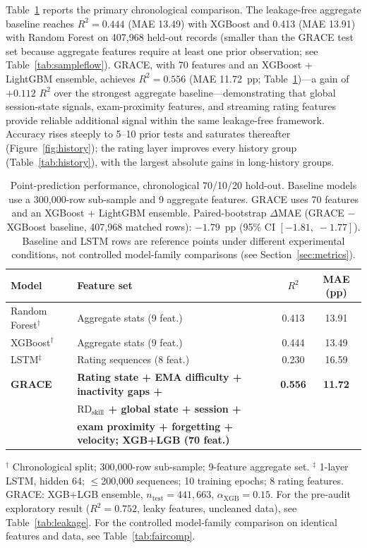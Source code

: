 \documentclass[11pt]{article}
\begin{document}
Table~\ref{tab:headline} reports the primary chronological comparison.
The leakage-free aggregate baseline reaches $R^{2}=0.444$ (MAE 13.49) with XGBoost and
0.413 (MAE 13.91) with Random Forest on 407{,}968 held-out records
(smaller than the GRACE test set because aggregate features require at least one prior observation;
see Table~\ref{tab:sampleflow}).
GRACE, with 70 features and an XGBoost + LightGBM ensemble, achieves $R^{2}=0.556$
(MAE 11.72~pp; Table~\ref{tab:headline})---a gain of $+0.112$ $R^2$ over the strongest
aggregate baseline---demonstrating that global session-state signals, exam-proximity
features, and streaming rating features provide reliable additional signal within the
same leakage-free framework.
Accuracy rises steeply to 5--10 prior tests and saturates thereafter
(Figure~\ref{fig:history}); the rating layer improves every history group
(Table~\ref{tab:history}), with the largest absolute gains in long-history groups.

\begin{table}[ht]
\centering
\caption{Point-prediction performance, chronological 70/10/20 hold-out.
Baseline models use a 300{,}000-row sub-sample and 9 aggregate features.
GRACE uses 70 features and an XGBoost + LightGBM ensemble.
Paired-bootstrap $\Delta$MAE (GRACE $-$ XGBoost baseline, 407{,}968 matched rows):
$-1.79$~pp (95\% CI $[-1.81,\;-1.77]$).
Baseline and LSTM rows are reference points under different experimental conditions, not
controlled model-family comparisons (see Section~\ref{sec:metrics}).}
\label{tab:headline}
\small
\begin{tabular}{@{}lp{4.8cm}cc@{}}
\toprule
\textbf{Model} & \textbf{Feature set} & $R^{2}$ & \textbf{MAE (pp)} \\
\midrule
Random Forest$^\dagger$ & Aggregate stats (9 feat.) & 0.413 & 13.91 \\
XGBoost$^\dagger$       & Aggregate stats (9 feat.) & 0.444 & 13.49 \\
LSTM$^\ddagger$         & Rating sequences (8 feat.) & 0.230 & 16.59 \\
\midrule
\textbf{GRACE}           & \textbf{Rating state + EMA difficulty + inactivity gaps +} & \textbf{0.556} & \textbf{11.72} \\
                        & \textbf{$\mathrm{RD}_{\text{skill}}$ + global state + session +} & & \\
                        & \textbf{exam proximity + forgetting + velocity; XGB+LGB (70 feat.)} & & \\
\bottomrule
\end{tabular}
\vspace{2pt}
{\footnotesize
$^\dagger$ Chronological split; 300{,}000-row sub-sample; 9-feature aggregate set.
$^\ddagger$ 1-layer LSTM, hidden 64; $\leq$200{,}000 sequences; 10 training epochs; 8 rating features.
GRACE: XGB+LGB ensemble, $n_{\text{test}}=441{,}663$, $\alpha_{\text{XGB}}=0.15$.
For the pre-audit exploratory result ($R^2=0.752$, leaky features, uncleaned data), see Table~\ref{tab:leakage}.
For the controlled model-family comparison on identical features and data, see Table~\ref{tab:faircomp}.}
\end{table}
\end{document}
